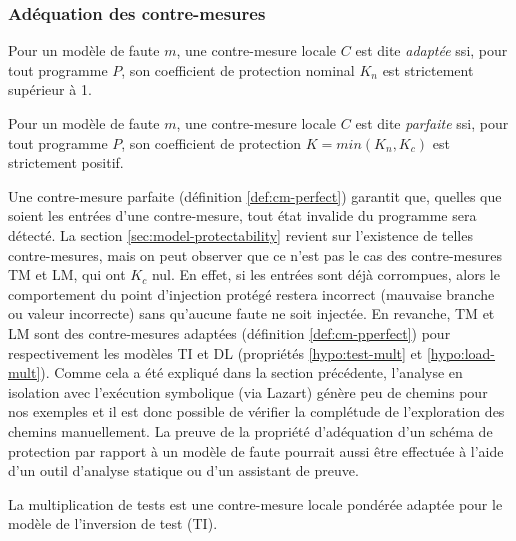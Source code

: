             \subsubsection{Adéquation des contre-mesures}
            \label{sec:cm-perfect}
        
                \begin{defi}[Adéquation]
                    \label{def:cm-pperfect}
                    Pour un modèle de faute $m$, une contre-mesure locale $C$ est dite \textit{adaptée} ssi, pour tout programme $P$, son coefficient de protection nominal $K_n$ est strictement supérieur à 1.
                \end{defi}
                
                \begin{defi}[Perfection]
                    \label{def:cm-perfect}
                    Pour un modèle de faute $m$, une contre-mesure locale $C$ est dite \textit{parfaite} ssi, pour tout programme $P$, son coefficient de protection $K = min(K_n, K_c)$ est strictement positif. 
                \end{defi}
                
                Une contre-mesure parfaite (définition \ref{def:cm-perfect}) garantit que, quelles que soient les entrées d'une contre-mesure, tout état invalide du programme sera détecté. 
                La section \ref{sec:model-protectability} revient sur l'existence de telles contre-mesures, mais on peut observer que ce n'est pas le cas des contre-mesures \gls{TM} et \gls{LM}, qui ont $K_c$ nul. En effet, si les entrées sont déjà corrompues, alors le comportement du point d'injection protégé restera incorrect (mauvaise branche ou valeur incorrecte) sans qu'aucune faute ne soit injectée.
                En revanche, \gls{TM} et \gls{LM} sont des contre-mesures adaptées (définition \ref{def:cm-pperfect}) pour respectivement les modèles \gls{TI} et \gls{DL} (propriétés \ref{hypo:test-mult} et \ref{hypo:load-mult}).
                Comme cela a été expliqué dans la section précédente, l'analyse en isolation avec l'exécution symbolique (via Lazart) génère peu de chemins pour nos exemples et il est donc possible de vérifier la complétude de l'exploration des chemins manuellement. 
                La preuve de la propriété d'adéquation d'un schéma de protection par rapport à un modèle de faute pourrait aussi être effectuée à l'aide d'un outil d'analyse statique ou d'un assistant de preuve.
                
                \begin{proper}
                    \label{hypo:test-mult}
                    La multiplication de tests est une contre-mesure locale pondérée adaptée pour le modèle de l'inversion de test (\gls{TI}).
                \end{proper}
            
